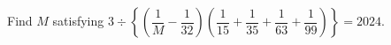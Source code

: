 Find $M$ satisfying $3\div\left\{\left(\dfrac{1}{M}-\dfrac{1}{32}\right)\left(\dfrac{1}{15}+\dfrac{1}{35}+\dfrac{1}{63}+\dfrac{1}{99}\right)\right\}=2024$.
